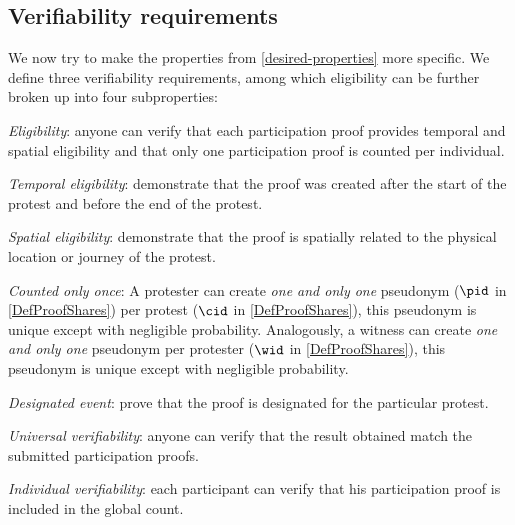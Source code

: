 \subsection{Verifiability requirements}%
\label{verifiability-properties}

We now try to make the properties from \cref{desired-properties} more 
specific.
We define three verifiability requirements, among which eligibility can be 
further broken up into four subproperties:
\begin{requirements}[V]
  \item\label{EligibilityVerif} \emph{Eligibility}: anyone can verify that each participation proof provides temporal and spatial eligibility and that only one participation proof is counted per individual.
    \begin{requirements}

    \item\label{TemporallyRelated} \emph{Temporal eligibility}: demonstrate that the proof was created after the start of the protest and before the end of the protest.

    \item\label{SpatiallyRelated} \emph{Spatial eligibility}: demonstrate that the proof is spatially related to the physical location or journey of the protest.

    \item\label{CountOnce} \emph{Counted only once}:
      A protester can create \emph{one and only one} pseudonym (\(\pid\) in 
      \cref{DefProofShares}) per protest (\(\cid\) in \cref{DefProofShares}), 
      this pseudonym is unique except with negligible probability.
      Analogously, a witness can create \emph{one and only one} pseudonym per 
      protester (\(\wid\) in \cref{DefProofShares}), this pseudonym is unique 
      except with negligible probability.

    \item\label{DesignatedEvent} \emph{Designated event}: prove that the proof 
      is designated for the particular protest.

    \end{requirements}

  \item\label{UniversalVerif} \emph{Universal verifiability}: anyone can verify that the result obtained match the submitted participation proofs.

  \item\label{IndividualVerif} \emph{Individual verifiability}: each participant can verify that his participation proof is included in the global count.
\end{requirements}

